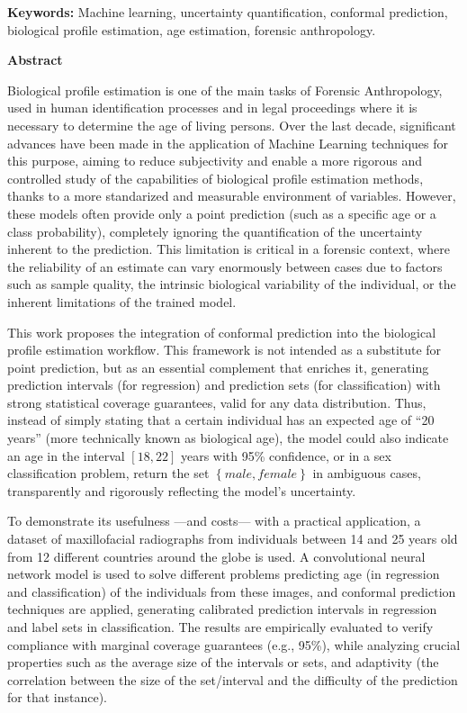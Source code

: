 \noindent\textbf{Keywords:} Machine learning, uncertainty quantification, conformal prediction, biological profile estimation, age estimation, forensic anthropology.

\vspace{0.7cm}

\noindent\textbf{Abstract}

Biological profile estimation is one of the main tasks of Forensic Anthropology, used in human identification processes and in legal proceedings where it is necessary to determine the age of living persons. Over the last decade, significant advances have been made in the application of Machine Learning techniques for this purpose, aiming to reduce subjectivity and enable a more rigorous and controlled study of the capabilities of biological profile estimation methods, thanks to a more standarized and measurable environment of variables. However, these models often provide only a point prediction (such as a specific age or a class probability), completely ignoring the quantification of the uncertainty inherent to the prediction.
This limitation is critical in a forensic context, where the reliability of an estimate can vary enormously between cases due to factors such as sample quality, the intrinsic biological variability of the individual, or the inherent limitations of the trained model.

This work proposes the integration of conformal prediction into the biological profile estimation workflow. This framework is not intended as a substitute for point prediction, but as an essential complement that enriches it, generating prediction intervals (for regression) and prediction sets (for classification) with strong statistical coverage guarantees, valid for any data distribution. Thus, instead of simply stating that a certain individual has an expected age of ``20 years'' (more technically known as biological age), the model could also indicate an age in the interval $[18, 22]$ years with 95\% confidence, or in a sex classification problem, return the set $\left\{male, female\right\}$ in ambiguous cases, transparently and rigorously reflecting the model's uncertainty.

To demonstrate its usefulness ---and costs--- with a practical application, a dataset of maxillofacial radiographs from individuals between 14 and 25 years old from 12 different countries around the globe is used. A convolutional neural network model is used to solve different problems predicting age (in regression and classification) of the individuals from these images, and conformal prediction techniques are applied, generating calibrated prediction intervals in regression and label sets in classification. The results are empirically evaluated to verify compliance with marginal coverage guarantees (e.g., 95\%), while analyzing crucial properties such as the average size of the intervals or sets, and adaptivity (the correlation between the size of the set/interval and the difficulty of the prediction for that instance).


